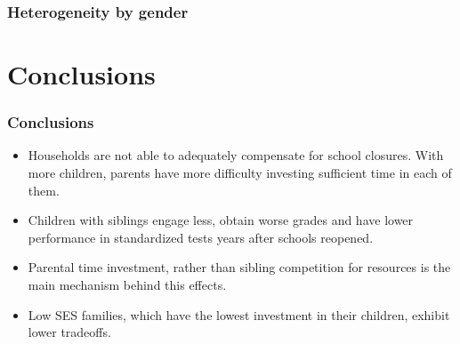 \documentclass{beamer}
\begin{document}
    \begin{frame}
            \label{frame:ece_gender}
            \frametitle{Heterogeneity by gender}
        {
    }   %
   
    \end{frame} 
    

\section{Conclusions}

\begin{frame}
    \label{frame:conclusions}
    \frametitle{Conclusions}
    \begin{itemize}
        \item Households are not able to adequately compensate for school closures. With more children, parents have more difficulty investing sufficient time in each of them. 
        \item Children with siblings engage less, obtain worse grades and have lower performance in standardized tests years after schools reopened.
        \item Parental time investment, rather than sibling competition for resources is the main mechanism behind this effects.
        \item Low SES families, which have the lowest investment in their children, exhibit lower tradeoffs.
    \end{itemize}
\end{frame}
\end{document}
